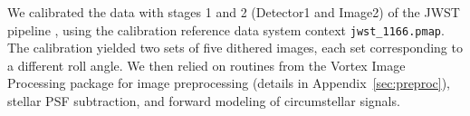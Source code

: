 \documentclass[longauth]{aa}
\newcommand{\vc}[1]{#1}
\begin{document}
    We calibrated %
    the data with stages 1 and 2 (Detector1 and Image2) of the JWST pipeline \citep[v1.10.2;][]{Bushouse2023}, using the calibration reference data system context \texttt{jwst\_1166.pmap}.
    The calibration %
    yielded two sets of five dithered images, %
    each set corresponding to a different roll angle.
    We then relied on routines from the Vortex Image Processing \citep[VIP;][]{GomezGonzalez2017,Christiaens2023} package
    for image preprocessing (details in Appendix~\ref{sec:preproc}), stellar PSF subtraction, and \vc{forward modeling} of circumstellar signals.
\end{document}
